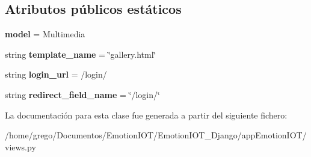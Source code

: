 \subsection*{Atributos públicos estáticos}
\begin{DoxyCompactItemize}
\item 
{\bfseries model} = Multimedia\hypertarget{classappEmotionIOT_1_1views_1_1Gallery_a02755f43870029b60a31b83ed44584bf}{}\label{classappEmotionIOT_1_1views_1_1Gallery_a02755f43870029b60a31b83ed44584bf}

\item 
string {\bfseries template\+\_\+name} = \char`\"{}gallery.\+html\char`\"{}\hypertarget{classappEmotionIOT_1_1views_1_1Gallery_a8e9201c218e443148e506719ec090da9}{}\label{classappEmotionIOT_1_1views_1_1Gallery_a8e9201c218e443148e506719ec090da9}

\item 
string {\bfseries login\+\_\+url} = \textquotesingle{}/login/\textquotesingle{}\hypertarget{classappEmotionIOT_1_1views_1_1Gallery_a241b6823d97da649cd02c25c1108d709}{}\label{classappEmotionIOT_1_1views_1_1Gallery_a241b6823d97da649cd02c25c1108d709}

\item 
string {\bfseries redirect\+\_\+field\+\_\+name} = \char`\"{}/login/\char`\"{}\hypertarget{classappEmotionIOT_1_1views_1_1Gallery_ac51b736cee05bb29bfba320f61319857}{}\label{classappEmotionIOT_1_1views_1_1Gallery_ac51b736cee05bb29bfba320f61319857}

\end{DoxyCompactItemize}


La documentación para esta clase fue generada a partir del siguiente fichero\+:\begin{DoxyCompactItemize}
\item 
/home/grego/\+Documentos/\+Emotion\+I\+O\+T/\+Emotion\+I\+O\+T\+\_\+\+Django/app\+Emotion\+I\+O\+T/views.\+py\end{DoxyCompactItemize}
